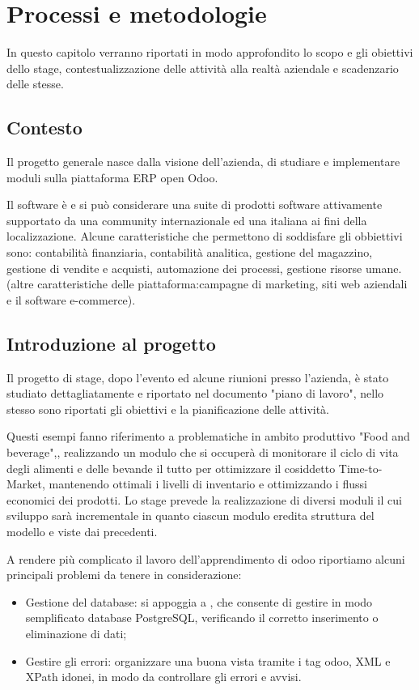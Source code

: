 
\hypertarget{(chap:capitolo2)}{}
\chapter{Processi e metodologie}
In questo capitolo verranno riportati in modo approfondito lo scopo e gli obiettivi dello stage, contestualizzazione delle attività alla realtà aziendale e scadenzario delle stesse.

\section{Contesto}
Il progetto generale nasce dalla visione dell'azienda, di studiare e implementare moduli sulla piattaforma ERP open Odoo.

Il software è  e si può considerare una suite di prodotti software attivamente supportato da una community internazionale ed una italiana ai fini della localizzazione.
Alcune caratteristiche che permettono di soddisfare gli obbiettivi sono: contabilità finanziaria, contabilità analitica, gestione del magazzino, gestione di vendite e acquisti, automazione dei processi, gestione risorse umane. (altre caratteristiche delle piattaforma:campagne di marketing, siti web aziendali e il software e-commerce).

\section{Introduzione al progetto}
Il progetto di stage, dopo l'evento  ed alcune riunioni presso l'azienda, è stato studiato dettagliatamente e riportato nel documento "piano di lavoro", nello stesso sono riportati gli obiettivi e la pianificazione delle attività.

Questi esempi fanno riferimento a problematiche in ambito produttivo "Food and beverage",, realizzando un modulo che si occuperà di monitorare il ciclo di vita degli alimenti e delle bevande il tutto per ottimizzare il cosiddetto Time-to-Market, mantenendo ottimali i livelli di inventario e ottimizzando i flussi economici dei prodotti.
Lo stage prevede la realizzazione di diversi moduli il cui sviluppo sarà incrementale in quanto ciascun modulo eredita struttura del modello e viste dai precedenti.

A rendere più complicato il lavoro dell'apprendimento di odoo riportiamo alcuni principali problemi da tenere in considerazione:
\begin{itemize}
	\item Gestione del database: si appoggia a , che consente di gestire in modo semplificato database PostgreSQL, verificando il corretto inserimento o eliminazione di dati;
	\item Gestire gli errori: organizzare una buona vista tramite i tag odoo, XML e XPath idonei, in modo da controllare gli errori e avvisi.
\end{itemize}

